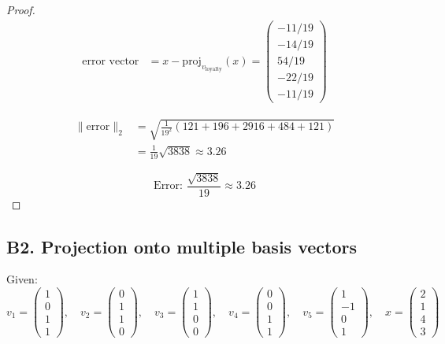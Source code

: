 \documentclass[12pt]{article}
\theoremstyle{definition}
\begin{document}
\begin{proof}
\begin{align*}
\text{error vector} &= x - \text{proj}_{v_{\text{loyalty}}}(x) = \begin{pmatrix} -11/19 \\ -14/19 \\ 54/19 \\ -22/19 \\ -11/19 \end{pmatrix}
\end{align*}

\begin{align*}
\|\text{error}\|_2 &= \sqrt{\frac{1}{19^2}(121 + 196 + 2916 + 484 + 121)} \\
&= \frac{1}{19}\sqrt{3838} \approx 3.26
\end{align*}

\[
\boxed{\text{Error: } \frac{\sqrt{3838}}{19} \approx 3.26}
\]
\end{proof}

\newpage
\subsection*{B2. Projection onto multiple basis vectors}

Given:
\[
v_1 = \begin{pmatrix} 1 \\ 0 \\ 1 \\ 1 \end{pmatrix}, \quad
v_2 = \begin{pmatrix} 0 \\ 1 \\ 1 \\ 0 \end{pmatrix}, \quad
v_3 = \begin{pmatrix} 1 \\ 1 \\ 0 \\ 0 \end{pmatrix}, \quad
v_4 = \begin{pmatrix} 0 \\ 0 \\ 1 \\ 1 \end{pmatrix}, \quad
v_5 = \begin{pmatrix} 1 \\ -1 \\ 0 \\ 1 \end{pmatrix}, \quad
x = \begin{pmatrix} 2 \\ 1 \\ 4 \\ 3 \end{pmatrix}
\]
\end{document}

